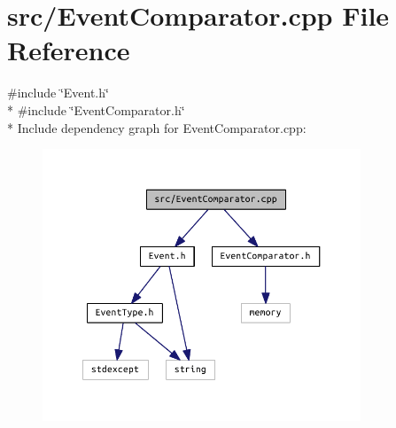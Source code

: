\section{src/\+Event\+Comparator.cpp File Reference}
\label{_event_comparator_8cpp}
{\ttfamily \#include \char`\"{}Event.\+h\char`\"{}}\\*
{\ttfamily \#include \char`\"{}Event\+Comparator.\+h\char`\"{}}\\*
Include dependency graph for Event\+Comparator.\+cpp\+:\nopagebreak
\begin{figure}[H]
\begin{center}
\leavevmode
\includegraphics[width=269pt]{_event_comparator_8cpp__incl}
\end{center}
\end{figure}
